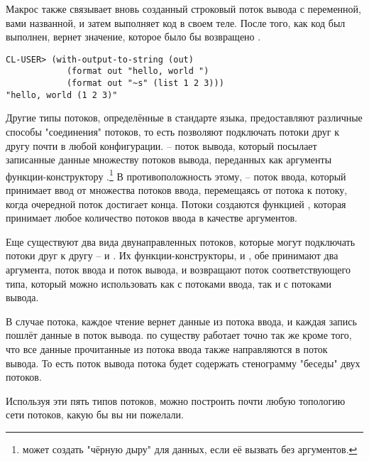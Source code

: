 Макрос  также связывает вновь созданный строковый поток вывода
с переменной, вами названной, и затем выполняет код в своем теле. После того, как код был
выполнен,  вернет значение, которое было бы возвращено
.
 
\begin{lstlisting}
CL-USER> (with-output-to-string (out) 
            (format out "hello, world ") 
            (format out "~s" (list 1 2 3))) 
"hello, world (1 2 3)" 
\end{lstlisting}

Другие типы потоков, определённые в стандарте языка, предоставляют различные способы
"соединения" потоков, то есть позволяют подключать потоки друг к другу почти в любой
конфигурации.  -- поток вывода, который посылает записанные данные
множеству потоков вывода, переданных как аргументы функции-конструктору
.\footnote{ может создать "чёрную
  дыру" для данных, если её вызвать без аргументов.} В противоположность этому,
 -- поток ввода, который принимает ввод от множества потоков
ввода, перемещаясь от потока к потоку, когда очередной поток достигает конца. Потоки
 создаются функцией , которая
принимает любое количество потоков ввода в качестве аргументов.

Еще существуют два вида двунаправленных потоков, которые могут подключать потоки друг к
другу --  и . Их функции-конструкторы,
 и , обе принимают два аргумента, поток
ввода и поток вывода, и возвращают поток соответствующего типа, который можно использовать
как с потоками ввода, так и с потоками вывода.

В случае  потока, каждое чтение вернет данные из потока ввода, и
каждая запись пошлёт данные в поток вывода.  по существу работает точно
так же кроме того, что все данные прочитанные из потока ввода также направляются в поток
вывода. То есть поток вывода потока  будет содержать стенограмму
"беседы" двух потоков.

Используя эти пять типов потоков, можно построить почти любую топологию сети потоков,
какую бы вы ни пожелали.


